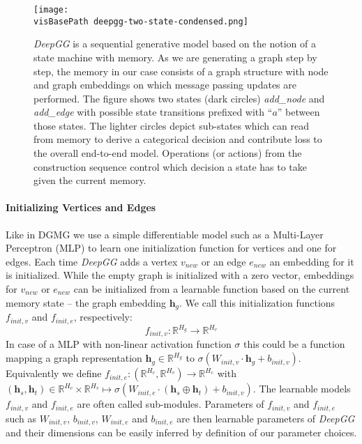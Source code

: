 \documentclass{article}
\newcommand{\visBasePath}[0]{vis/}
\begin{document}
\begin{figure*}
  \begin{minipage}[c]{0.55\linewidth}
    \caption{
		\textit{DeepGG} is a sequential generative model based on the notion of a state machine with memory.
		As we are generating a graph step by step, the memory in our case consists of a graph structure with node and graph embeddings on which message passing updates are performed.
		The figure shows two states (dark circles) \textit{add\_node} and \textit{add\_edge} with possible state transitions prefixed with ``$a$'' between those states.
		The lighter circles depict sub-states which can read from memory to derive a categorical decision and contribute loss to the overall end-to-end model.
		Operations (or actions) from the construction sequence control which decision a state has to take given the current memory.
	}
	\label{fig:deepgg-two-states}
  \end{minipage}\hfill
  \begin{minipage}[c]{0.44\linewidth}
    \texttt{[image: \\visBasePath deepgg-two-state-condensed.png]}
  \end{minipage}
\end{figure*}


\paragraph{Initializing Vertices and Edges} Like in DGMG \cite[4.1]{li2018learning} we use a simple differentiable model such as a Multi-Layer Perceptron (MLP) to learn one initialization function for vertices and one for edges.
Each time \textit{DeepGG} adds a vertex $v_{new}$ or an edge $e_{new}$ an embedding for it is initialized.
While the empty graph is initialized with a zero vector, embeddings for $v_{new}$ or $e_{new}$ can be initialized from a learnable function based on the current memory state -- the graph embedding $\boldsymbol{h}_g$.
We call this initialization functions $f_{init,v}$ and $f_{init,e}$, respectively:
\[
	f_{init,v}: \mathbb{R}^{H_g} \rightarrow \mathbb{R}^{H_v}
\]
In case of a MLP with non-linear activation function $\sigma$ this could be a function mapping a graph representation $\boldsymbol{h}_g\in\mathbb{R}^{H_g}$ to $\sigma\left(W_{init,v}\cdot \boldsymbol{h}_g + b_{init,v}\right)$.
Equivalently we define	$f_{init,e}: (\mathbb{R}^{H_v}, \mathbb{R}^{H_v}) \rightarrow \mathbb{R}^{H_e}$ with $(\boldsymbol{h}_s, \boldsymbol{h}_t)\in\mathbb{R}^{H_v}\times\mathbb{R}^{H_v}\mapsto \sigma\left(W_{init,e}\cdot (\boldsymbol{h}_s \oplus \boldsymbol{h}_t) + b_{init,v}\right)$.
The learnable models $f_{init,v}$ and $f_{init,e}$ are often called sub-modules.
Parameters of $f_{init,v}$ and $f_{init,e}$ such as $W_{init,v}$, $b_{init,v}$, $W_{init,e}$ and $b_{init,e}$ are then learnable parameters of \textit{DeepGG} and their dimensions can be easily inferred by definition of our parameter choices.
\end{document}
